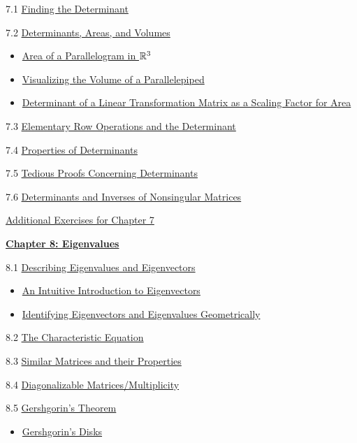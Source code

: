 \documentclass{ximera}
\begin{document}
7.1	\href{\xmbaseurl/DET-0010/main}{Finding the Determinant}
	
7.2	\href{\xmbaseurl/DET-0070/main}{Determinants, Areas, and Volumes}
\begin{itemize}
    \item 
    \href{https://www.geogebra.org/m/g7g6kjqm}{Area of a Parallelogram in $\mathbb{R}^3$}
    \item 
    \href{https://www.geogebra.org/classic/tfuzeqwr}{Visualizing the Volume of a Parallelepiped}
    \item
    \href{https://www.geogebra.org/m/nr8jsz4w}{Determinant of a Linear Transformation Matrix as a Scaling Factor for Area}
\end{itemize}
	
7.3	\href{\xmbaseurl/DET-0030/main}{Elementary Row Operations and the Determinant}
	
7.4	\href{\xmbaseurl/DET-0040/main}{Properties of Determinants}
	
7.5	\href{\xmbaseurl/DET-0050/main}{Tedious Proofs Concerning Determinants}
	
7.6	\href{\xmbaseurl/DET-0060/main}{Determinants and Inverses of Nonsingular Matrices}
	
\href{\xmbaseurl/SUPX-0070/main}{Additional Exercises for Chapter 7}
	
\href{\xmbaseurl/XLAChapter_eigenvalues/main}{\textbf{Chapter 8: Eigenvalues}}
	
8.1	\href{\xmbaseurl/EIG-0010/main}{Describing Eigenvalues and Eigenvectors}
\begin{itemize}
    \item 
    \href{https://www.geogebra.org/m/ub4kqvmz}{An Intuitive Introduction to Eigenvectors}
    \item
    \href{https://www.geogebra.org/m/vd3fydmg}{Identifying Eigenvectors and Eigenvalues Geometrically}
\end{itemize}
	
8.2	\href{\xmbaseurl/EIG-0020/main}{The Characteristic Equation}
	
8.3	\href{\xmbaseurl/EIG-0040/main}{Similar Matrices and their Properties}
	
8.4	\href{\xmbaseurl/EIG-0050/main}{Diagonalizable Matrices/Multiplicity}
	
8.5	\href{\xmbaseurl/EIG-0080/main}{Gershgorin's Theorem}
\begin{itemize}
    \item 
    \href{https://www.geogebra.org/m/jrpqazq4}{Gershgorin's Disks}
\end{itemize}
	
\end{document}

